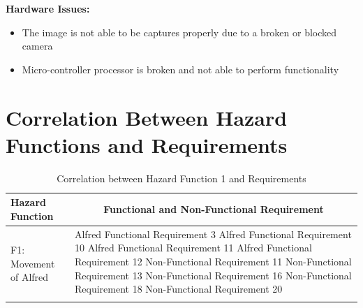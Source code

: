 \documentclass [10pt]{article}
\begin{document}
	\textbf{Hardware Issues:}
		\begin {itemize}
			\item The image is not able to be captures properly due to a broken or blocked camera
			\item Micro-controller processor is broken and not able to perform functionality
		\end {itemize}



\newpage



\section{Correlation Between Hazard Functions and  Requirements}


\begin{longtable}{| p{ } | p{ } |}
\hline 
\centering \textbf{Hazard Function} & 
\multicolumn{1}{c}{\textbf {Functional and Non-Functional Requirement}}\\ \hline
\multirow{7}{*}{F1: Movement of Alfred}& 
		{Alfred Functional Requirement 3 \newline
		Alfred Functional Requirement 10 \newline
		Alfred Functional Requirement 11 \newline
		Alfred Functional Requirement 12 \newline
		Non-Functional Requirement 11 \newline
		Non-Functional Requirement 13 \newline
		Non-Functional Requirement 16 \newline
		Non-Functional Requirement 18 \newline
		Non-Functional Requirement 20} \\ 
\hline 
\caption{Correlation between Hazard Function 1 and Requirements}  
\end{longtable}


\end{document}
